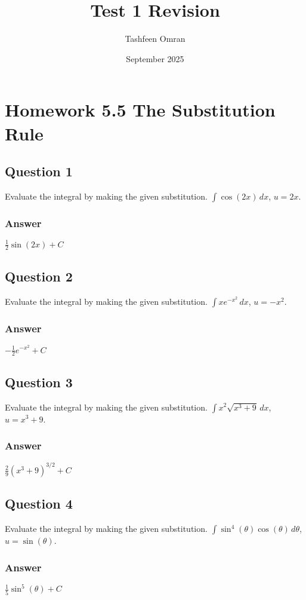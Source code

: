 \documentclass{article}
\title{Test 1 Revision}
\author{Tashfeen Omran}
\date{September 2025}
\begin{document}
\maketitle

\section{Homework 5.5 The Substitution Rule}

\subsection*{Question 1}
Evaluate the integral by making the given substitution. $\int \cos(2x) \,dx$, $u = 2x$.
\subsubsection*{Answer}
$ \frac{1}{2}\sin(2x) + C $

\subsection*{Question 2}
Evaluate the integral by making the given substitution. $\int xe^{-x^2} \,dx$, $u = -x^2$.
\subsubsection*{Answer}
$ -\frac{1}{2}e^{-x^2} + C $

\subsection*{Question 3}
Evaluate the integral by making the given substitution. $\int x^2\sqrt{x^3 + 9} \,dx$, $u = x^3 + 9$.
\subsubsection*{Answer}
$ \frac{2}{9}(x^3 + 9)^{3/2} + C $

\subsection*{Question 4}
Evaluate the integral by making the given substitution. $\int \sin^4(\theta)\cos(\theta) \,d\theta$, $u = \sin(\theta)$.
\subsubsection*{Answer}
$ \frac{1}{5}\sin^5(\theta) + C $
\end{document}
